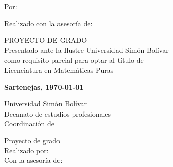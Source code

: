     \vspace{1.5cm}

    \UppercaseBold{
        \wrapto[14cm][\centering]
        {\MainTitle}
    }

    \vspace{1.5cm}

    Por:
    \\
    \autor

    \vspace{1.5cm}

    Realizado con la asesoría de:
    \\
    \tutor

    \vspace{3cm}

    \MakeUppercase{Proyecto de Grado}\\
    Presentado ante la Ilustre Universidad Simón Bolívar\\
    como requisito parcial para optar al título de\\
    Licenciatura en Matemáticas Puras

    \vspace{\fill}

    \textbf{Sartenejas, \today}\par
\egroup
{}
\fi
\ifresumen\newpage
\thispagestyle{plain}
%
\PrintUsbLogo
    {
        Universidad Simón Bolívar\\
        Decanato de estudios profesionales\\
        Coordinación de \coord
    }

\begin{center}
    \begin{minipage}{14cm}
        \centering
        \UppercaseBold
            {
                \MainTitle
            }
    \end{minipage}

    \vspace{.5cm}

    \UpperCase
        {
            Proyecto de grado
        } \\
    Realizado por: \autor \\
    Con la asesoría de: \tutor \\[.5cm]

\end{center}

